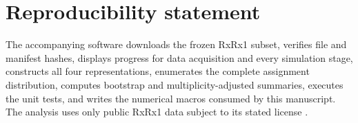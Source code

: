 \documentclass[11pt]{article}
\theoremstyle{definition}
\theoremstyle{remark}
\newcommand{\1}{\mathbf 1}
\begin{document}
\section*{Reproducibility statement}

The accompanying software downloads the frozen RxRx1 subset, verifies file and
manifest hashes, displays progress for data acquisition and every simulation
stage, constructs all four representations, enumerates the complete assignment
distribution, computes bootstrap and multiplicity-adjusted summaries, executes
the unit tests, and writes the numerical macros consumed by this manuscript.
The analysis uses only public RxRx1 data subject to its stated license
\citep{rxrx1website}.



\end{document}

